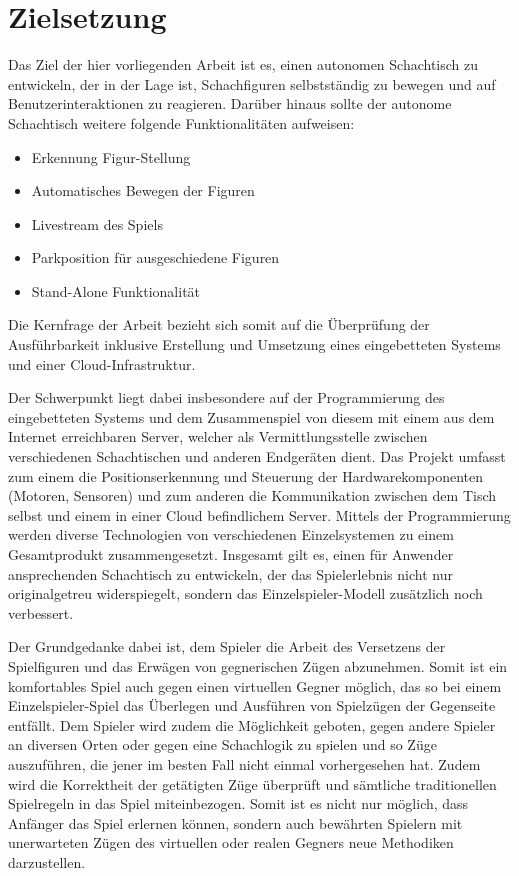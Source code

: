 \hypertarget{zielsetzung}{%
\section{Zielsetzung}\label{zielsetzung}}

Das Ziel der hier vorliegenden Arbeit ist es, einen autonomen
Schachtisch zu entwickeln, der in der Lage ist, Schachfiguren
selbstständig zu bewegen und auf Benutzerinteraktionen zu reagieren.
Darüber hinaus sollte der autonome Schachtisch weitere folgende
Funktionalitäten aufweisen:

\begin{itemize}
\tightlist
\item
  Erkennung Figur-Stellung
\item
  Automatisches Bewegen der Figuren
\item
  Livestream des Spiels
\item
  Parkposition für ausgeschiedene Figuren
\item
  Stand-Alone Funktionalität
\end{itemize}

Die Kernfrage der Arbeit bezieht sich somit auf die Überprüfung der
Ausführbarkeit inklusive Erstellung und Umsetzung eines eingebetteten
Systems und einer Cloud-Infrastruktur.

Der Schwerpunkt liegt dabei insbesondere auf der Programmierung des
eingebetteten Systems und dem Zusammenspiel von diesem mit einem aus dem
Internet erreichbaren Server, welcher als Vermittlungsstelle zwischen
verschiedenen Schachtischen und anderen Endgeräten dient. Das Projekt
umfasst zum einem die Positionserkennung und Steuerung der
Hardwarekomponenten (Motoren, Sensoren) und zum anderen die
Kommunikation zwischen dem Tisch selbst und einem in einer Cloud
befindlichem Server. Mittels der Programmierung werden diverse
Technologien von verschiedenen Einzelsystemen zu einem Gesamtprodukt
zusammengesetzt. Insgesamt gilt es, einen für Anwender ansprechenden
Schachtisch zu entwickeln, der das Spielerlebnis nicht nur
originalgetreu widerspiegelt, sondern das Einzelspieler-Modell
zusätzlich noch verbessert.

Der Grundgedanke dabei ist, dem Spieler die Arbeit des Versetzens der
Spielfiguren und das Erwägen von gegnerischen Zügen abzunehmen. Somit
ist ein komfortables Spiel auch gegen einen virtuellen Gegner möglich,
das so bei einem Einzelspieler-Spiel das Überlegen und Ausführen von
Spielzügen der Gegenseite entfällt. Dem Spieler wird zudem die
Möglichkeit geboten, gegen andere Spieler an diversen Orten oder gegen
eine Schachlogik zu spielen und so Züge auszuführen, die jener im besten
Fall nicht einmal vorhergesehen hat. Zudem wird die Korrektheit der
getätigten Züge überprüft und sämtliche traditionellen Spielregeln in
das Spiel miteinbezogen. Somit ist es nicht nur möglich, dass Anfänger
das Spiel erlernen können, sondern auch bewährten Spielern mit
unerwarteten Zügen des virtuellen oder realen Gegners neue Methodiken
darzustellen.

